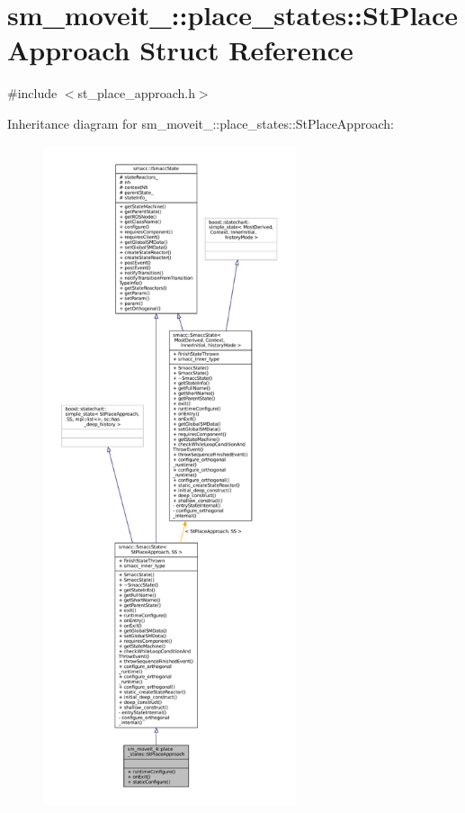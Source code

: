 \hypertarget{structsm__moveit__4_1_1place__states_1_1StPlaceApproach}{}\section{sm\+\_\+moveit\+\_\+:\+:place\+\_\+states\+:\+:St\+Place\+Approach Struct Reference}
\label{structsm__moveit__4_1_1place__states_1_1StPlaceApproach}


{\ttfamily \#include $<$st\+\_\+place\+\_\+approach.\+h$>$}



Inheritance diagram for sm\+\_\+moveit\+\_\+:\+:place\+\_\+states\+:\+:St\+Place\+Approach\+:
\nopagebreak
\begin{figure}[H]
\begin{center}
\leavevmode
\includegraphics[height=550pt]{structsm__moveit__4_1_1place__states_1_1StPlaceApproach__inherit__graph}
\end{center}
\end{figure}


